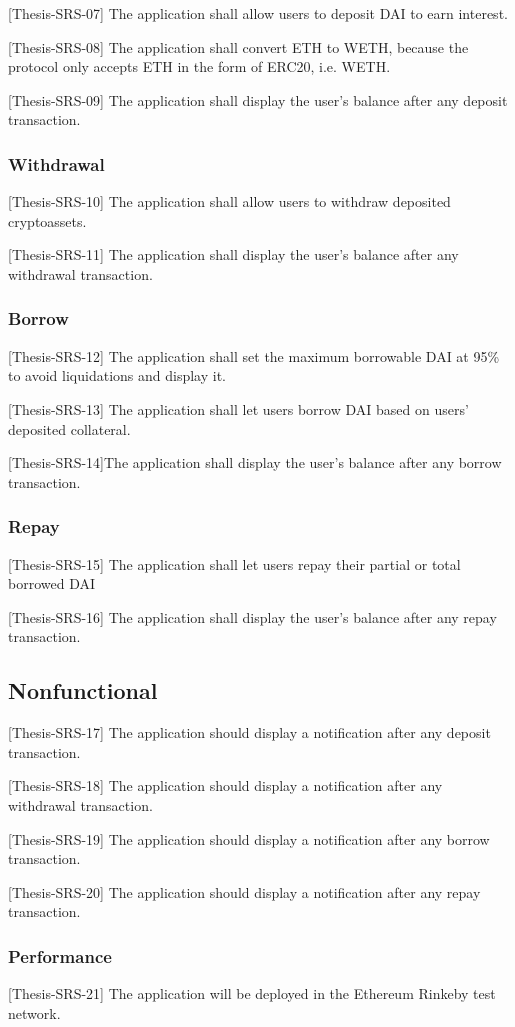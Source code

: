 \documentclass[11pt,a4paper]{report}
\begin{document}
[Thesis-SRS-07] The application shall allow users to deposit DAI to earn interest.

[Thesis-SRS-08] The application shall convert ETH to WETH, because the protocol only accepts ETH in the form of ERC20, i.e. WETH.

[Thesis-SRS-09] The application shall display the user's balance after any deposit transaction.

\subsubsection{Withdrawal}
[Thesis-SRS-10] The application shall allow users to withdraw deposited cryptoassets.

[Thesis-SRS-11] The application shall display the user's balance after any withdrawal transaction.

\subsubsection{Borrow}
[Thesis-SRS-12] The application shall set the maximum borrowable DAI at 95\% to avoid liquidations and display it.

[Thesis-SRS-13] The application shall let users borrow DAI based on users' deposited collateral.

[Thesis-SRS-14]The application shall display the user's balance after any borrow transaction.
\subsubsection{Repay}
[Thesis-SRS-15] The application shall let users repay their partial or total borrowed DAI 

[Thesis-SRS-16] The application shall display the user's balance after any repay transaction.
\subsection{Nonfunctional}

[Thesis-SRS-17] The application should display a notification after any deposit transaction.

[Thesis-SRS-18] The application should display a notification after any withdrawal transaction.

[Thesis-SRS-19] The application should display a notification after any borrow transaction.

[Thesis-SRS-20] The application should display a notification after any repay transaction.
\subsubsection{Performance}
[Thesis-SRS-21] The application will be deployed in the Ethereum Rinkeby test network.
\end{document}
